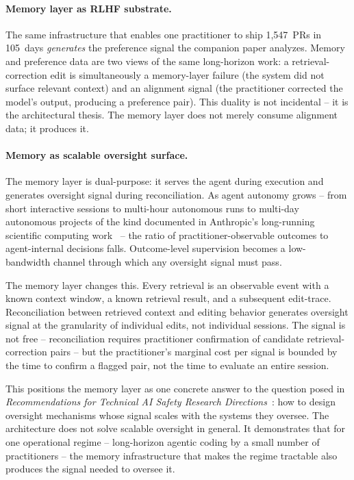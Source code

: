 \documentclass[11pt]{article}
\begin{document}
\paragraph{Memory layer as RLHF substrate.}
The same infrastructure that enables one practitioner to ship 1{,}547~PRs in 105~days \emph{generates} the preference signal the companion paper analyzes.
Memory and preference data are two views of the same long-horizon work: a retrieval-correction edit is simultaneously a memory-layer failure (the system did not surface relevant context) and an alignment signal (the practitioner corrected the model's output, producing a preference pair).
This duality is not incidental -- it is the architectural thesis.
The memory layer does not merely consume alignment data; it produces it.

\paragraph{Memory as scalable oversight surface.}
The memory layer is dual-purpose: it serves the agent during execution and generates oversight signal during reconciliation.
As agent autonomy grows -- from short interactive sessions to multi-hour autonomous runs to multi-day autonomous projects of the kind documented in Anthropic's long-running scientific computing work~\citep{anthropic2026longrunning} -- the ratio of practitioner-observable outcomes to agent-internal decisions falls.
Outcome-level supervision becomes a low-bandwidth channel through which any oversight signal must pass.

The memory layer changes this.
Every retrieval is an observable event with a known context window, a known retrieval result, and a subsequent edit-trace.
Reconciliation between retrieved context and editing behavior generates oversight signal at the granularity of individual edits, not individual sessions.
The signal is not free -- reconciliation requires practitioner confirmation of candidate retrieval-correction pairs -- but the practitioner's marginal cost per signal is bounded by the time to confirm a flagged pair, not the time to evaluate an entire session.

This positions the memory layer as one concrete answer to the question posed in \emph{Recommendations for Technical AI Safety Research Directions}~\citep{anthropic2025recommended}: how to design oversight mechanisms whose signal scales with the systems they oversee.
The architecture does not solve scalable oversight in general.
It demonstrates that for one operational regime -- long-horizon agentic coding by a small number of practitioners -- the memory infrastructure that makes the regime tractable also produces the signal needed to oversee it.
\end{document}
